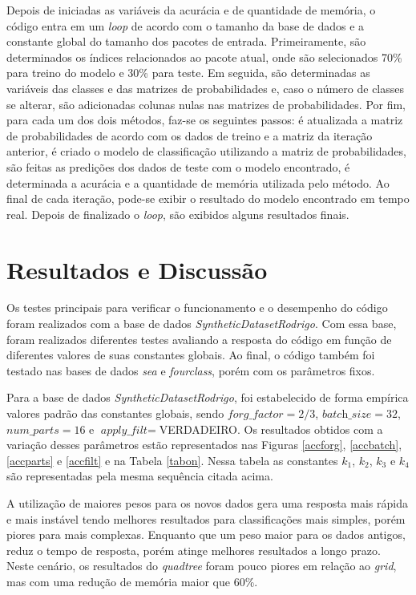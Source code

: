 \documentclass[conference]{IEEEtran}
\begin{document}
Depois de iniciadas as variáveis da acurácia e de quantidade de memória, o código entra em um \textit{loop} de acordo com o tamanho da base de dados e a constante global do tamanho dos pacotes de entrada. Primeiramente, são determinados os índices relacionados ao pacote atual, onde são selecionados 70\% para treino do modelo e 30\% para teste. Em seguida, são determinadas as variáveis das classes e das matrizes de probabilidades e, caso o número de classes se alterar, são adicionadas colunas nulas nas matrizes de probabilidades. Por fim, para cada um dos dois métodos, faz-se os seguintes passos: é atualizada a matriz de probabilidades de acordo com os dados de treino e a matriz da iteração anterior, é criado o modelo de classificação utilizando a matriz de probabilidades, são feitas as predições dos dados de teste com o modelo encontrado, é determinada a acurácia e a quantidade de memória utilizada pelo método. Ao final de cada iteração, pode-se exibir o resultado do modelo encontrado em tempo real. Depois de finalizado o \textit{loop}, são exibidos alguns resultados finais.



\section{Resultados e Discussão} \label{result}

Os testes principais para verificar o funcionamento e o desempenho do código foram realizados com a base de dados \textit{SyntheticDatasetRodrigo}. Com essa base, foram realizados diferentes testes avaliando a resposta do código em função de diferentes valores de suas constantes globais. Ao final, o código também foi testado nas bases de dados \textit{sea} e \textit{fourclass}, porém com os parâmetros fixos.

Para a base de dados \textit{SyntheticDatasetRodrigo}, foi estabelecido de forma empírica valores padrão das constantes globais, sendo $\textit{forg\_factor} = 2/3$, $\textit{batch\_size} = 32$, $\textit{num\_parts} = 16$ e $\textit{apply\_filt} = $VERDADEIRO. Os resultados obtidos com a variação desses parâmetros estão representados nas Figuras \ref{accforg}, \ref{accbatch}, \ref{accparts} e \ref{accfilt} e na Tabela \ref{tabon}. Nessa tabela as constantes $k_{1}$, $k_{2}$, $k_{3}$ e $k_{4}$ são representadas pela mesma sequência citada acima.

A utilização de maiores pesos para os novos dados gera uma resposta mais rápida e mais instável tendo melhores resultados para classificações mais simples, porém piores para mais complexas. Enquanto que um peso maior para os dados antigos, reduz o tempo de resposta, porém atinge melhores resultados a longo prazo. Neste cenário, os resultados do \textit{quadtree} foram pouco piores em relação ao \textit{grid}, mas com uma redução de memória maior que 60\%.
\end{document}

